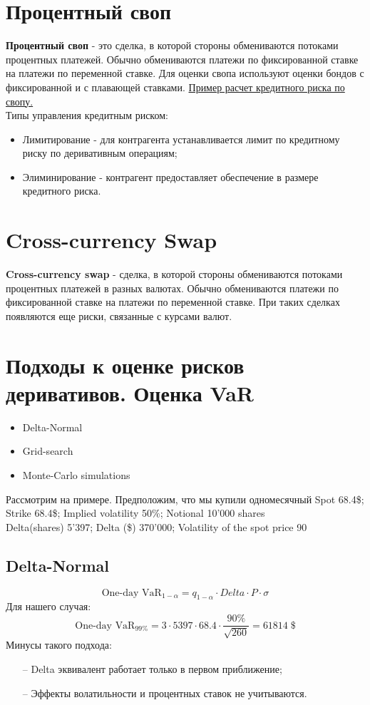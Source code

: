 \documentclass{article}
\begin{document}
\section{Процентный своп}
\textbf{Процентный своп} - это сделка, в которой стороны обмениваются потоками процентных платежей. Обычно обмениваются платежи по фиксированной ставке на платежи по переменной ставке.
Для оценки свопа используют оценки бондов с фиксированной и с плавающей ставками.
\href{https://youtu.be/ev2jSbH9G9U?t=1789}{Пример расчет кредитного риска по свопу.}\\
Типы управления кредитным риском:
\begin{itemize}
\item 
Лимитирование - для контрагента устанавливается лимит по кредитному риску по деривативным операциям;
\item
Элиминирование - контрагент предоставляет обеспечение в размере кредитного риска.
\end{itemize}
\section{Cross-currency Swap}
\textbf{Cross-currency swap} - сделка, в которой стороны обмениваются потоками процентных платежей в разных валютах. Обычно обмениваются платежи по фиксированной ставке на платежи по переменной ставке. При таких сделках появляются еще риски, связанные с курсами валют.
\section{Подходы к оценке рисков деривативов. Оценка VaR}
\begin{itemize}
\item
Delta-Normal
\item
Grid-search
\item
Monte-Carlo simulations
\end{itemize}
Рассмотрим на примере.  Предположим, что мы купили одномесячный 
Spot 68.4\$; Strike 68.4\$; Implied volatility 50\%; Notional 10'000 shares\\
Delta(shares) 5'397; Delta (\$) 370'000; Volatility of the spot price 90%
\subsection{Delta-Normal}
$$\text{One-day } \text{VaR}_{1-\alpha} = q_{1-\alpha}\cdot Delta\cdot P\cdot\sigma$$
Для нашего случая:
$$\text{One-day } \text{VaR}_{99\%} = 3\cdot5397\cdot68.4\cdot\frac{90\%}{\sqrt{260}} = 61814\; \$ $$
Минусы такого подхода:
\begin{itemize}
\item[--]
Delta эквивалент работает только в первом приближение;
\item[--]
Эффекты волатильности и процентных ставок не учитываются.
\end{itemize}
\end{document}
